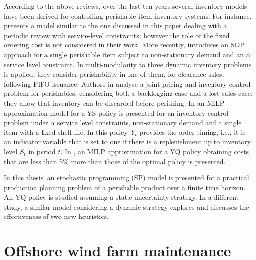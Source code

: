 According to the above reviews, over the last ten years several inventory models have been derived for controlling perishable item inventory systems. For instance, \cite{citeulike:6806835} presents a model similar to  the one discussed in this paper dealing with a periodic review with service-level constraints; however the role of the fixed ordering cost is not considered in their work. More recently, \cite{citeulike:12534249} introduces an SDP approach for a single perishable item subject to non-stationary demand and an $\alpha$ service level constraint. In
\cite{doi:10.1287/msom.2014.0488} multi-modularity to three dynamic inventory problems is applied; they consider perishability in one of them, for clearance sales, following FIFO issuance. Authors in \cite{doi:10.1287/opre.2014.1261} analyse a joint pricing and inventory control problem for perishables, considering both a backlogging case and a lost-sales case; they allow that inventory can be discarded before perishing.	
In \cite{citeulike:13666707} an MILP approximation model for a YS policy is presented for an inventory control problem under $\alpha$ service level constraints, non-stationary demand and a single item with a fixed shelf life. In this policy, $Y_t$ provides the order timing, i.e., it is an indicator variable that is set to one if there is a replenishment up to inventory level $S_t$ in period $t$.  In \cite{PaulsWorm2015}, an MILP approximation for a YQ policy obtaining costs that are less than 5\% more than those of the optimal policy is presented.

In this thesis, an stochastic programming (SP) model is presented for a practical production planning problem of a perishable product over a finite time horizon. An YQ policy is studied assuming a static uncertainty strategy. In a different study, a similar model considering a dynamic strategy explores and discusses the effectiveness of two new heuristics.


\section{Offshore wind farm maintenance}
\label{sec:OWFmaintenance}

